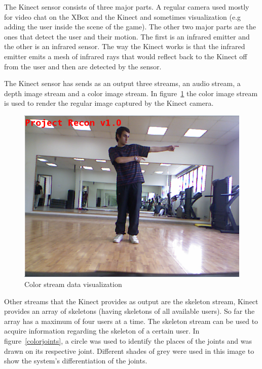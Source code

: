 The Kinect sensor consists of three major parts. A regular camera used mostly for video chat on the XBox and the Kinect and sometimes visualization (e.g adding the user inside the scene of the game). The other two major parts are the ones that detect the user and their motion. The first is an infrared emitter and the other is an infrared sensor. The way the Kinect works is that the infrared emitter emits a mesh of infrared rays that would reflect back to the Kinect off from the user and then are detected by the sensor.

The Kinect sensor has sends as an output three streams, an audio stream, a depth image stream and a color image stream. In figure~\ref{colordata} the color image stream is used to render the regular image captured by the Kinect camera.

\begin{figure}[!htbp]
\centering
\includegraphics[width=1\textwidth]{images/color_data.png}
\caption{Color stream data visualization}
\label{colordata}
\end{figure}

Other streams that the Kinect provides as output are the skeleton stream, Kinect provides an array of skeletons (having skeletons of all available users). So far the array has a maximum of four users at a time. The skeleton stream can be used to acquire information regarding the skeleton of a certain user. In figure~\ref{colorjoints}, a circle was used to identify the places of the joints and was drawn on its respective joint. Different shades of grey were used in this image to show the system's differentiation of the joints.

